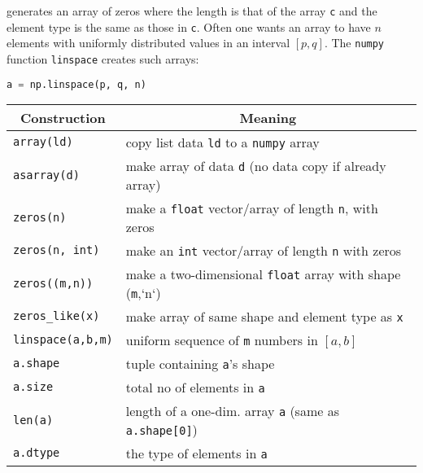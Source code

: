 \documentclass[graybox,sectrefs,envcountresetchap,open=right,final]{svmonodo}
\begin{document}
generates an array of zeros where the length is that of the array \texttt{c}
and the element type is the same as those in \texttt{c}.
Often one wants an array to have $n$ elements with uniformly
distributed values in an interval $[p,q]$. The \texttt{numpy} function
\texttt{linspace} creates such arrays:
\begin{lstlisting}[language=Python,style=simple,xleftmargin=2mm]
a = np.linspace(p, q, n)

\end{lstlisting}

\begin{center}
{\small   %
\vspace{4mm}
\begin{tabular}{ll}
\hline
\multicolumn{1}{c}{ Construction } & \multicolumn{1}{c}{ Meaning } \\
\hline
\texttt{array(ld)}       & copy list data \texttt{ld} to a \texttt{numpy} array                    \\
\texttt{asarray(d)}      & make array of data \texttt{d} (no data copy if already array)         \\
\texttt{zeros(n)}        & make a \texttt{float} vector/array of length \texttt{n}, with zeros     \\
\texttt{zeros(n, int)}   & make an \texttt{int} vector/array of length \texttt{n} with zeros       \\
\texttt{zeros((m,n))}    & make a two-dimensional \texttt{float} array with shape (\texttt{m},`n`) \\
\Verb!zeros_like(x)!   & make array of same shape and element type as \texttt{x}               \\
\texttt{linspace(a,b,m)} & uniform sequence of \texttt{m} numbers in $[a,b]$                     \\
\texttt{a.shape}         & tuple containing \texttt{a}'s shape                                   \\
\texttt{a.size}          & total no of elements in \texttt{a}                                    \\
\texttt{len(a)}          & length of a one-dim. array \texttt{a} (same as \texttt{a.shape[0]})     \\
\texttt{a.dtype}         & the type of elements in \texttt{a}                                    \\

\end{tabular}}
\end{center}
\end{document}
